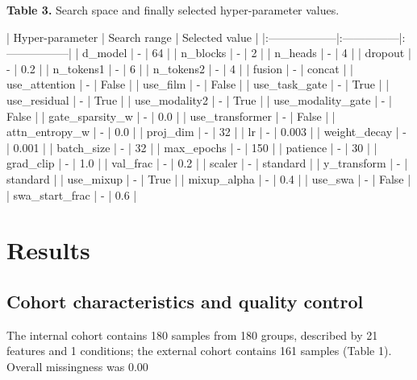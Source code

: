 \documentclass[utf8]{FrontiersinHarvard}
\begin{document}
\textbf{Table 3.} Search space and finally selected hyper-parameter values.

| Hyper-parameter   | Search range   | Selected value   |
|:------------------|:---------------|:-----------------|
| d_model           | -              | 64               |
| n_blocks          | -              | 2                |
| n_heads           | -              | 4                |
| dropout           | -              | 0.2              |
| n_tokens1         | -              | 6                |
| n_tokens2         | -              | 4                |
| fusion            | -              | concat           |
| use_attention     | -              | False            |
| use_film          | -              | False            |
| use_task_gate     | -              | True             |
| use_residual      | -              | True             |
| use_modality2     | -              | True             |
| use_modality_gate | -              | False            |
| gate_sparsity_w   | -              | 0.0              |
| use_transformer   | -              | False            |
| attn_entropy_w    | -              | 0.0              |
| proj_dim          | -              | 32               |
| lr                | -              | 0.003            |
| weight_decay      | -              | 0.001            |
| batch_size        | -              | 32               |
| max_epochs        | -              | 150              |
| patience          | -              | 30               |
| grad_clip         | -              | 1.0              |
| val_frac          | -              | 0.2              |
| scaler            | -              | standard         |
| y_transform       | -              | standard         |
| use_mixup         | -              | True             |
| mixup_alpha       | -              | 0.4              |
| use_swa           | -              | False            |
| swa_start_frac    | -              | 0.6              |


\section{Results}


\subsection{Cohort characteristics and quality control}

The internal cohort contains 180 samples from 180 groups, described by 21 features and 1 conditions; the external cohort contains 161 samples (Table 1). Overall missingness was 0.00%
\end{document}
